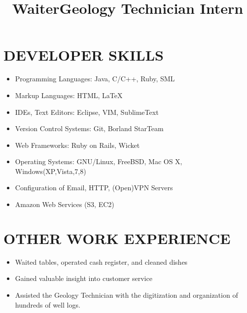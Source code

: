 \documentclass[line, overlapped]{res}
\begin{document}
\begin{resume}
	\section{DEVELOPER SKILLS}
	\begin{itemize}[leftmargin=10pt]
		\item Programming Languages:  Java, C/C++, Ruby, SML
        \item Markup Languages:  HTML, \LaTeX
        \item IDEs, Text Editors:  Eclipse, VIM, SublimeText
        \item Version Control Systems:  Git, Borland StarTeam
        \item Web Frameworks:  Ruby on Rails, Wicket
	\item Operating Systems:  GNU/Linux, FreeBSD, Mac OS X, Windows(XP,Vista,7,8)
	\item Configuration of Email, HTTP, (Open)VPN Servers
        \item Amazon Web Services (S3, EC2)
	\end{itemize}
	
	\section{OTHER WORK EXPERIENCE}
	
    \title{Waiter}
    \begin{position}
        \begin{itemize}
            \item Waited tables, operated cash register, and cleaned dishes
            \item Gained valuable insight into customer service
        \end{itemize}
    \end{position}

    \title{Geology Technician Intern}
    \begin{position}
        \begin{itemize}
            \item Assisted the Geology Technician with the digitization and organization of hundreds of well logs.
        \end{itemize}
    \end{position}



\end{resume}
\end{document}

